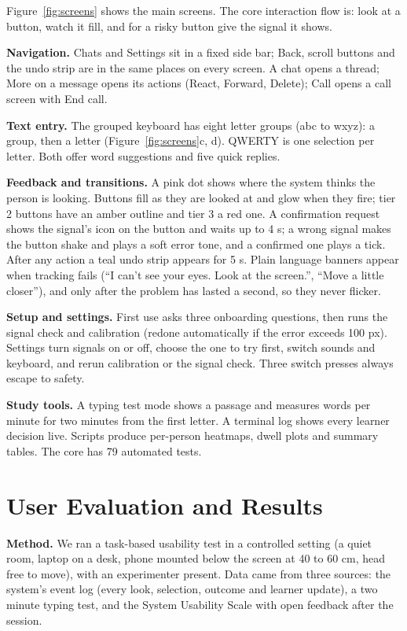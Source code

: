 \documentclass[manuscript,review]{acmart}
\begin{document}
Figure~\ref{fig:screens} shows the main screens. The core interaction flow is: look at a button,
watch it fill, and for a risky button give the signal it shows.

\textbf{Navigation.} Chats and Settings sit in a fixed side bar; Back, scroll buttons and the undo
strip are in the same places on every screen. A chat opens a thread; More on a message opens its
actions (React, Forward, Delete); Call opens a call screen with End call.

\textbf{Text entry.} The grouped keyboard has eight letter groups (abc to wxyz): a group, then a
letter (Figure~\ref{fig:screens}c, d). QWERTY is one selection per letter. Both offer word
suggestions and five quick replies.

\textbf{Feedback and transitions.} A pink dot shows where the system thinks the person is looking.
Buttons fill as they are looked at and glow when they fire; tier 2 buttons have an amber outline
and tier 3 a red one. A confirmation request shows the signal's icon on the button and waits up to
4 s; a wrong signal makes the button shake and plays a soft error tone, and a confirmed one plays a
tick. After any action a teal undo strip appears for 5 s. Plain language banners appear when
tracking fails (``I can't see your eyes. Look at the screen.'', ``Move a little closer''), and only
after the problem has lasted a second, so they never flicker.

\textbf{Setup and settings.} First use asks three onboarding questions, then runs the signal check
and calibration (redone automatically if the error exceeds 100 px). Settings turn signals on or
off, choose the one to try first, switch sounds and keyboard, and rerun calibration or the signal
check. Three switch presses always escape to safety.

\textbf{Study tools.} A typing test mode shows a passage and measures words per minute for two
minutes from the first letter. A terminal log shows every learner decision live. Scripts produce
per-person heatmaps, dwell plots and summary tables. The core has 79 automated tests.

\section{User Evaluation and Results}

\textbf{Method.} We ran a task-based usability test in a controlled setting (a quiet room, laptop
on a desk, phone mounted below the screen at 40 to 60 cm, head free to move), with an experimenter
present. Data came from three sources: the system's event log (every look, selection, outcome and
learner update), a two minute typing test, and the System Usability Scale \cite{brooke1996} with
open feedback after the session.
\end{document}
